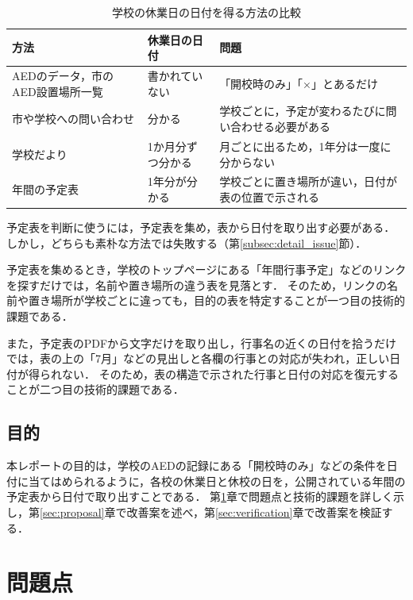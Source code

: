 \documentclass[a4paper,12pt,oneside]{jex}
\begin{document}
\begin{table}[htbp]
\centering
\caption{学校の休業日の日付を得る方法の比較}
\label{tab:source}
{\small\setlength{\tabcolsep}{3pt}
\begin{tabular}{p{42mm}p{30mm}p{80mm}}
\toprule
\raggedright 方法 & \raggedright 休業日の日付 & \raggedright 問題 \tabularnewline
\midrule
\raggedright AEDのデータ，市のAED設置場所一覧 & \raggedright 書かれていない & \raggedright 「開校時のみ」「×」とあるだけ \tabularnewline
\raggedright 市や学校への問い合わせ & \raggedright 分かる & \raggedright 学校ごとに，予定が変わるたびに問い合わせる必要がある \tabularnewline
\raggedright 学校だより & \raggedright 1か月分ずつ分かる & \raggedright 月ごとに出るため，1年分は一度に分からない \tabularnewline
\raggedright 年間の予定表 & \raggedright 1年分が分かる & \raggedright 学校ごとに置き場所が違い，日付が表の位置で示される \tabularnewline
\bottomrule
\end{tabular}}
\end{table}

予定表を判断に使うには，予定表を集め，表から日付を取り出す必要がある．
しかし，どちらも素朴な方法では失敗する（第\ref{subsec:detail_issue}節）．

予定表を集めるとき，学校のトップページにある「年間行事予定」などのリンクを探すだけでは，名前や置き場所の違う表を見落とす．
そのため，リンクの名前や置き場所が学校ごとに違っても，目的の表を特定することが一つ目の技術的課題である．

また，予定表のPDFから文字だけを取り出し，行事名の近くの日付を拾うだけでは，表の上の「7月」などの見出しと各欄の行事との対応が失われ，正しい日付が得られない．
そのため，表の構造で示された行事と日付の対応を復元することが二つ目の技術的課題である．

\subsection{目的}
\label{subsec:aim}

本レポートの目的は，学校のAEDの記録にある「開校時のみ」などの条件を日付に当てはめられるように，各校の休業日と休校の日を，公開されている年間の予定表から日付で取り出すことである．
第\ref{sec:problem}章で問題点と技術的課題を詳しく示し，第\ref{sec:proposal}章で改善案を述べ，第\ref{sec:verification}章で改善案を検証する．

\section{問題点}
\label{sec:problem}
\end{document}
